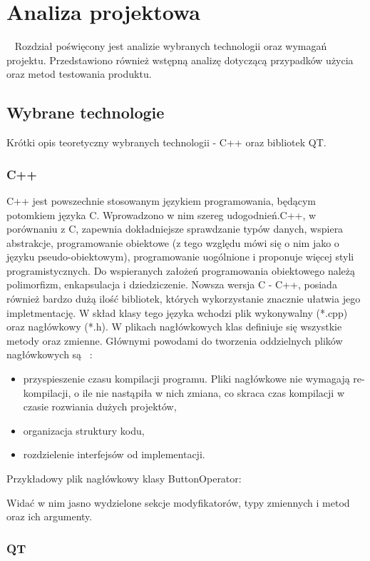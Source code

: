 \documentclass[twoside,a4paper]{book}
\begin{document}
\chapter{Analiza projektowa} ~\label{sec:chap3} 
Rozdział poświęcony jest analizie wybranych technologii oraz wymagań projektu. Przedstawiono również wstępną analizę dotyczącą przypadków użycia oraz metod testowania produktu.
\section{Wybrane technologie}
Krótki opis teoretyczny wybranych technologii - C++ oraz bibliotek QT. 
\subsection{C++}

C++ jest powszechnie stosowanym językiem programowania, będącym potomkiem języka C. Wprowadzono w nim szereg udogodnień.C++, w porównaniu z C, zapewnia dokładniejsze sprawdzanie typów danych, wspiera abstrakcje, programowanie obiektowe (z tego względu mówi się o nim jako o języku pseudo-obiektowym), programowanie uogólnione i proponuje więcej styli programistycznych. Do wspieranych założeń programowania obiektowego należą polimorfizm, enkapsulacja i dziedziczenie. Nowsza wersja C - C++, posiada również bardzo dużą ilość bibliotek, których wykorzystanie znacznie ułatwia jego impletmentację.
W skład klasy tego języka wchodzi plik wykonywalny (*.cpp) oraz nagłówkowy (*.h). W plikach nagłówkowych klas definiuje się wszystkie metody oraz zmienne. Głównymi powodami do tworzenia oddzielnych plików nagłówkowych są ~\cite{cppH}:
\begin{itemize}
\item przyspieszenie czasu kompilacji programu. Pliki nagłówkowe nie wymagają re-kompilacji, o ile nie nastąpiła w nich zmiana, co skraca czas kompilacji w czasie rozwiania dużych projektów,
\item organizacja struktury kodu, 
\item rozdzielenie interfejsów od implementacji.
\end{itemize}
Przykładowy plik nagłówkowy klasy ButtonOperator:

Widać w nim jasno wydzielone sekcje modyfikatorów, typy zmiennych i metod oraz ich argumenty. 
\subsection{QT}
\end{document}
